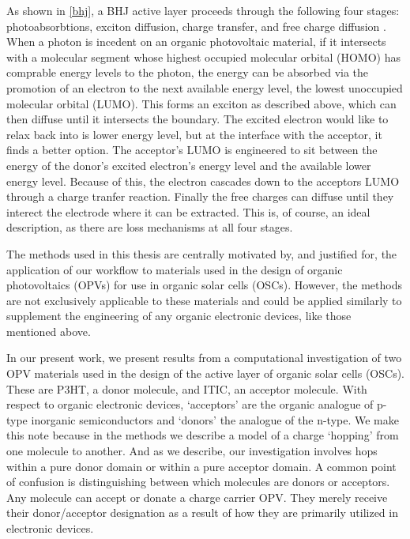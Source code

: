 As shown in \ref{bhj}, a BHJ active layer proceeds through the following four stages: photoabsorbtions, 
exciton diffusion, charge transfer, and free charge diffusion \cite{Fusella2019}. 
When a photon is incedent on
an organic photovoltaic material, if it intersects with a molecular segment whose 
highest occupied molecular orbital (HOMO) has comprable energy levels to the photon, the energy can be absorbed via the promotion of
an electron to the next available energy level, the lowest unoccupied molecular orbital (LUMO).
This forms an exciton as
described above, which can then diffuse until it intersects the boundary. 
The excited electron would like to relax
back into is lower energy level, but at the interface with the acceptor, it finds a better option. The
acceptor's LUMO is engineered to sit between the energy of the donor's excited electron's energy level and the
available lower energy level. Because of this, the electron cascades down to the acceptors LUMO through a charge
tranfer reaction. Finally the free charges can diffuse until they interect the electrode where it can be
extracted. This is, of course, an ideal description, as there are loss mechanisms at all four stages. 


The methods used in this thesis are centrally motivated by, and justified for, 
the application of our workflow to materials
used in the design of organic photovoltaics (OPVs) for use in organic solar cells (OSCs). However, the methods are
not exclusively applicable to these materials and could be applied similarly to supplement the engineering of any organic
electronic devices, like those mentioned above. 



In our present work, we present results from a computational investigation of two OPV materials
used in the design of the active layer of organic solar cells (OSCs). These are P3HT, a
donor molecule, and ITIC, an acceptor molecule. With respect to organic electronic devices, `acceptors' are the
organic analogue of p-type inorganic semiconductors and `donors' the analogue
of the n-type. We make this note because in the methods we describe a model of
a charge `hopping' from one molecule to another. And as we describe, our
investigation involves hops within a pure donor domain or within a pure
acceptor domain. A common point of confusion is distinguishing between which
molecules are donors or acceptors.
Any molecule can accept or donate a charge carrier OPV.
They merely receive their donor/acceptor designation as a result of how they
are primarily utilized in electronic devices. 

